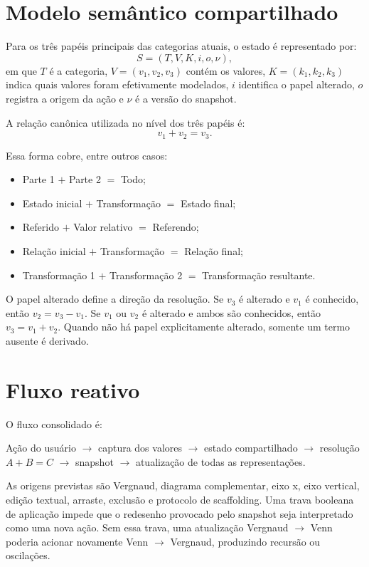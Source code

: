 \documentclass[12pt,a4paper]{article}
\begin{document}
\section{Modelo semântico compartilhado}

Para os três papéis principais das categorias atuais, o estado é representado por:
\[
S = (T, V, K, i, o, \nu),
\]
em que $T$ é a categoria, $V=(v_1,v_2,v_3)$ contém os valores, $K=(k_1,k_2,k_3)$ indica quais valores foram efetivamente modelados, $i$ identifica o papel alterado, $o$ registra a origem da ação e $\nu$ é a versão do snapshot.

A relação canônica utilizada no nível dos três papéis é:
\[
v_1 + v_2 = v_3.
\]

Essa forma cobre, entre outros casos:
\begin{itemize}[noitemsep]
  \item Parte 1 $+$ Parte 2 $=$ Todo;
  \item Estado inicial $+$ Transformação $=$ Estado final;
  \item Referido $+$ Valor relativo $=$ Referendo;
  \item Relação inicial $+$ Transformação $=$ Relação final;
  \item Transformação 1 $+$ Transformação 2 $=$ Transformação resultante.
\end{itemize}

O papel alterado define a direção da resolução. Se $v_3$ é alterado e $v_1$ é conhecido, então $v_2=v_3-v_1$. Se $v_1$ ou $v_2$ é alterado e ambos são conhecidos, então $v_3=v_1+v_2$. Quando não há papel explicitamente alterado, somente um termo ausente é derivado.

\section{Fluxo reativo}

O fluxo consolidado é:

\begin{center}
Ação do usuário $\rightarrow$ captura dos valores $\rightarrow$ estado compartilhado $\rightarrow$ resolução $A+B=C$ $\rightarrow$ snapshot $\rightarrow$ atualização de todas as representações.
\end{center}

As origens previstas são Vergnaud, diagrama complementar, eixo x, eixo vertical, edição textual, arraste, exclusão e protocolo de scaffolding. Uma trava booleana de aplicação impede que o redesenho provocado pelo snapshot seja interpretado como uma nova ação. Sem essa trava, uma atualização Vergnaud $\rightarrow$ Venn poderia acionar novamente Venn $\rightarrow$ Vergnaud, produzindo recursão ou oscilações.
\end{document}
